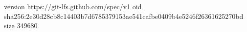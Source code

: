 version https://git-lfs.github.com/spec/v1
oid sha256:2e30d28cb8c14403b7d6785379153ae541cafbe0409b4e5246f26361625270bd
size 349680
